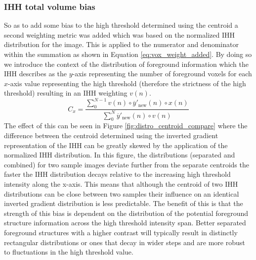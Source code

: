 \subsubsection{IHH total volume bias}
So as to add some bias to the high threshold determined using the centroid a second weighting metric was added which was based on the normalized IHH distribution for the image. This is applied to the numerator and denominator within the summation as shown in Equation \ref{eq:vox_weight_added}. By doing so we introduce the context of the distribution of foreground information which the IHH describes as the $y$-axis representing the number of foreground voxels for each $x$-axis value representing the high threshold (therefore the strictness of the high threshold) resulting in an IHH weighting $v(n)$.
\begin{equation}\label{eq:vox_weight_added}
    C_x = \frac{\sum_{0}^{N-1} v(n)\circ \overline{y}'_{\text{new}}(n)\circ x(n)}{\sum_{0}^{N}\overline{y}'_{\text{new}}(n)\circ v(n)}
\end{equation}
The effect of this can be seen in Figure \ref{fig:distro_centroid_compare} where the difference between the centroid determined using the inverted gradient representation of the IHH can be greatly skewed by the application of the normalized IHH distribution. In this figure, the distributions (separated and combined) for two sample images deviate further from the separate centroids the faster the IHH distribution decays relative to the increasing high threshold intensity along the x-axis. This means that although the centroid of two IHH distributions can be close between two samples their influence on an identical inverted gradient distribution is less predictable. The benefit of this is that the strength of this bias is dependent on the distribution of the potential foreground structure information across the high threshold intensity span. Better separated foreground structures with a higher contrast will typically result in distinctly rectangular distributions or ones that decay in wider steps and are more robust to fluctuations in the high threshold value.\par
